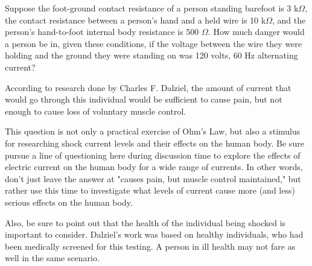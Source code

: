 

Suppose the foot-ground contact resistance of a person standing barefoot is 3 k$\Omega$, the contact resistance between a person's hand and a held wire is 10 k$\Omega$, and the person's hand-to-foot internal body resistance is 500 $\Omega$.  How much danger would a person be in, given these conditions, if the voltage between the wire they were holding and the ground they were standing on was 120 volts, 60 Hz alternating current?







According to research done by Charles F. Dalziel, the amount of current that would go through this individual would be sufficient to cause pain, but not enough to cause loss of voluntary muscle control.







This question is not only a practical exercise of Ohm's Law, but also a stimulus for researching shock current levels and their effects on the human body.  Be sure pursue a line of questioning here during discussion time to explore the effects of electric current on the human body for a wide range of currents.  In other words, don't just leave the answer at "causes pain, but muscle control maintained," but rather use this time to investigate what levels of current cause more (and less) serious effects on the human body.

Also, be sure to point out that the health of the individual being shocked is important to consider.  Dalziel's work was based on healthy individuals, who had been medically screened for this testing.  A person in ill health may not fare as well in the same scenario.




